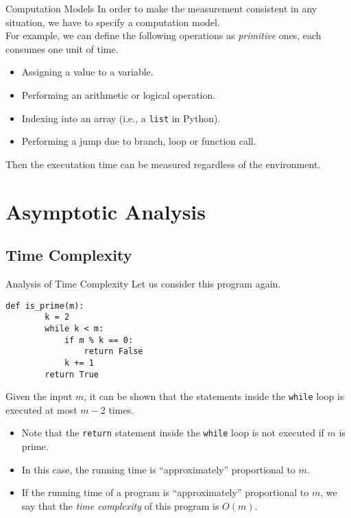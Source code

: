 \documentclass{beamer}
\begin{document}
\begin{frame}{Computation Models}
  In order to make the measurement consistent in any situation, we have to
  specify a computation model. \pause \\[.5em]
  For example, we can define the following operations as \emph{primitive} ones,
  each consumes one unit of time.
  \pause
  \begin{itemize}
    \item Assigning a value to a variable. \pause
    \item Performing an arithmetic or logical operation. \pause
    \item Indexing into an array (i.e., a \lstinline{list} in Python). \pause
    \item Performing a jump due to branch, loop or function call. \pause
  \end{itemize}
  Then the executation time can be measured regardless of the environment.
\end{frame}

\section{Asymptotic Analysis}
\subsection{Time Complexity}
\begin{frame}[fragile]{Analysis of Time Complexity}
  Let us consider this program again.
  \begin{block}{}
    \scriptsize
    \begin{lstlisting}[gobble=4]
    def is_prime(m):
        k = 2
        while k < m:
            if m % k == 0:
                return False
            k += 1
        return True
    \end{lstlisting}
    \pause
  \end{block}
  Given the input $m$, it can be shown that the statements inside the
  \lstinline{while} loop is executed at most $m - 2$ times. \pause
  \begin{itemize}
    \item Note that the \lstinline{return} statement inside the
    \lstinline{while} loop is not executed if $m$ is prime. \pause
    \item In this case, the running time is ``approximately'' proportional
    to $m$. \pause
    \item If the running time of a program is ``approximately'' proportional to
    $m$, we say that the \emph{time complexity} of this program is $O(m)$.
  \end{itemize}
\end{frame}
\end{document}
